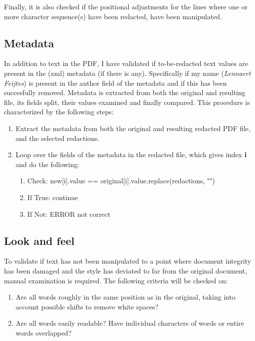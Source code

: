 Finally, it is also checked if the positional adjustments for the lines where one or more character sequence(s) have been redacted, have been manipulated.

\subsection{Metadata}

In addition to text in the PDF, I have validated if to-be-redacted text values are present in the (xml) metadata (if there is any). Specifically if my name (\textit{Lennaert Feijtes}) is present in the author field of the metadata and if this has been succesfully removed. Metadata is extracted from both the original and resulting file, its fields split, their values examined and finally compared. This procedure is characterized by the following steps:

\begin{enumerate}
    \item Extract the metadata from both the original and resulting redacted PDF file, and the selected redactions.
    \item Loop over the fields of the metadata in the redacted file, which gives index \textbf{i} and do the following:
        \begin{enumerate}
            \item Check: new[i].value == original[i].value.replace(redactions, "")
            \item If True: continue
            \item If Not: ERROR not correct
        \end{enumerate}
\end{enumerate}

\subsection{Look and feel}
To validate if text has not been manipulated to a point where document integrity has been damaged and the style has deviated to far from the original document, manual examination is required. The following criteria will be checked on:

\begin{enumerate}
    \item Are all words roughly in the same position as in the original, taking into account possible shifts to remove white spaces?
    \item Are all words easily readable? Have individual characters of words or entire words overlapped?
\end{enumerate}
